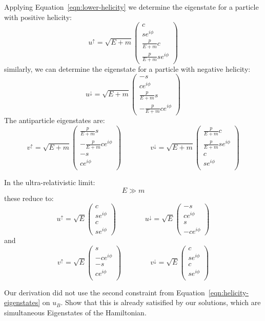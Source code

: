 \documentclass[12pt]{article}
\begin{document}
Applying Equation~\ref{eqn:lower-helicity} we determine the eigenstate for a particle
with positive helicity:
$$u^{\uparrow} = \sqrt{E+m}
\begin{pmatrix} c \\ s e^{i\phi} \\ \frac{p}{E+m} c \\[5pt] \frac{p}{E + m} s e^{i\phi}\end{pmatrix}
$$
similarly, we can determine the eigenstate for a particle with negative helicity:
$$u^{\downarrow} = \sqrt{E+m}
\begin{pmatrix} -s \\ c e^{i\phi} \\ \frac{p}{E+m} s \\[5pt] -\frac{p}{E + m} c e^{i\phi}\end{pmatrix}
$$
The antiparticle eigenstates are:
$$v^{\uparrow} = \sqrt{E+m}
\begin{pmatrix}
  \frac{p}{E+m} s \\[5pt] -\frac{p}{E + m} c e^{i\phi} \\ -s \\ c e^{i\phi} \\
\end{pmatrix}
\qquad \qquad
v^{\downarrow} = \sqrt{E+m}
\begin{pmatrix}
  \frac{p}{E+m} c \\[5pt] \frac{p}{E + m} s e^{i\phi} \\ c \\ s e^{i\phi} \\
\end{pmatrix}
$$

In the ultra-relativistic limit:
$$E \gg m$$
these reduce to:
$$u^{\uparrow} = \sqrt{E}
\begin{pmatrix} c \\ s e^{i\phi} \\ c \\[5pt] s e^{i\phi}\end{pmatrix}
\qquad \qquad
u^{\downarrow} = \sqrt{E}
\begin{pmatrix} -s \\ c e^{i\phi} \\ s \\[5pt] -c e^{i\phi}\end{pmatrix}
$$
and
$$v^{\uparrow} = \sqrt{E}
\begin{pmatrix}
  s \\[5pt] -c e^{i\phi} \\ -s \\ c e^{i\phi} \\
\end{pmatrix}
\qquad \qquad
v^{\downarrow} = \sqrt{E}
\begin{pmatrix}
  c \\[5pt] s e^{i\phi} \\ c \\ s e^{i\phi} \\
\end{pmatrix}
$$

\exercise Our derivation did not use the second constraint from
Equation~\ref{eqn:helicity-eigenstates} on $u_B$.  Show that this is
already satisified by our solutions, which are simultaneous
Eigenstates of the Hamiltonian.
\end{document}
